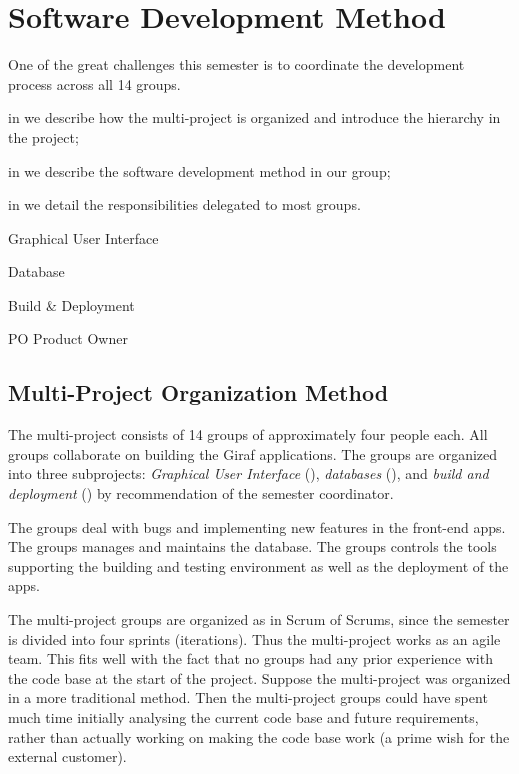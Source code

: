 \chapter{Software Development Method}\label{chap:sw_dev_method}
One of the great challenges this semester is to coordinate the development process across all 14 groups. 

\begin{chapterorganization}
  \item in  we describe how the multi-project is organized and introduce the hierarchy in the project;
  \item in  we describe the software development method in our group;
  \item in  we detail the responsibilities delegated to most groups.
\end{chapterorganization}

\begin{abbreviations}
  \item[\gui] Graphical User Interface
  \item[\db] Database
  \item[\bd] Build \& Deployment
  \item[PO] Product Owner
\end{abbreviations}

\section{Multi-Project Organization Method}\label{sec:project_overview}
The multi-project consists of 14 groups of approximately four people each. All groups collaborate on building the Giraf applications. The groups are organized into three subprojects: \emph{Graphical User Interface} (\gui), \emph{databases} (\db), and \emph{build and deployment} (\bd) by recommendation of the semester coordinator.

The \gui groups deal with bugs and implementing new features in the front-end apps. The \db groups manages and maintains the database. The \bd groups controls the tools supporting the building and testing environment as well as the deployment of the apps.

The multi-project groups are organized as in Scrum of Scrums, since the semester is divided into four sprints (iterations). Thus the multi-project works as an agile team. This fits well with the fact that no groups had any prior experience with the code base at the start of the project. Suppose the multi-project was organized in a more traditional method. Then the multi-project groups could have spent much time initially analysing the current code base and future requirements, rather than actually working on making the code base work (a prime wish for the external customer).

